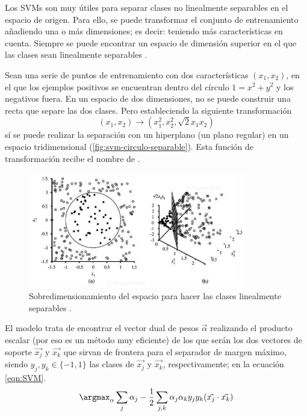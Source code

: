 Los SVMs son muy útiles para separar clases no linealmente separables en el espacio de origen. Para ello, se puede transformar el conjunto de entrenamiento añadiendo una o más dimensiones; es decir: teniendo más características en cuenta. Siempre se puede encontrar un espacio de dimensión superior en el que las clases sean linealmente separables \citep[cap. 18]{Russell2009}.

\begin{example}\label{exa:svm-circulo-separable}
Sean una serie de puntos de entrenamiento con dos características $(x_1,x_2)$, en el que los ejemplos positivos se encuentran dentro del círculo $1 = x^2 + y^2$ y los negativos fuera. En un espacio de dos dimensiones, no se puede construir una recta que separe las dos clases. Pero estableciendo la siguiente transformación
\[
\left(x_1, x_2\right) \longrightarrow \left(x_1^2, x_2^2, \sqrt{2} x_1 x_2\right)
\]
sí se puede realizar la separación con un hiperplano (un plano regular) en un espacio tridimensional (\autoref{fig:svm-circulo-separable}).
Esta función de transformación recibe el nombre de .
\end{example}

\begin{figure}[htbp]
\centering
\includegraphics[width=0.85\textwidth]{svm-circulo-separable}
\caption[Sobredimensionamiento del espacio para hacer las clases linealmente separables]{Sobredimensionamiento del espacio para hacer las clases linealmente separables \citep{Russell2009}.}
\label{fig:svm-circulo-separable}
\end{figure}

El modelo trata de encontrar el vector dual de pesos $\vec{\alpha}$ realizando el producto escalar (por eso es un método muy eficiente) de los que serán los dos vectores de soporte $\vec{x_j}$ y $\vec{x_k}$ que sirvan de frontera para el separador de margen máximo, siendo $y_j, y_k \in \{-1, 1\}$ las clases de $\vec{x_j}$ y $\vec{x_k}$, respectivamente; en la ecuación \eqref{eqn:SVM}.
\begin{equation}
\argmax_\alpha \sum_j \alpha_j - \frac{1}{2} \sum_{j,k}\alpha_j \alpha_k y_j y_k (\vec{x_j} \cdot \vec{x_k})
\label{eqn:SVM}
\end{equation}

